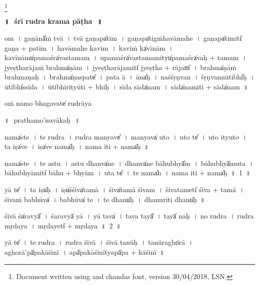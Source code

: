 \documentclass[parskip, DIV=14]{scrartcl}
\renewcommand{\thefootnote}{\fnsymbol{footnote}} %
\begin{document}
\LARGE\let\thefootnote\relax\footnote{\color{lightgray} Document written using \XeLaTeX{} and chandas font,  version 30/04/2018, LSN.}

\vspace{-1.5cm}

\begin{center}

\textbf{\Huge॥\,~śrī rudra krama pāṭha\,~॥}
\end{center}
\Large

{\centering	


\vspace{1cm}

om~। 
ga॒ṇānā̎ṁ tvā~।
tvā॒ ga॒ṇapa̍tim~।
ga॒ṇapa̍tigṁhavāmahe~।
ga॒ṇapa̍ti॒miti̍ ga॒ṇa + pa॒ti॒m~।
ha॒vā॒ma॒he॒ ka॒vim~।
ka॒viṁ ka̍vī॒nām~।
ka॒vī॒nāmu̍pa॒maśra̍vastamam~। 
u॒pa॒maśra̍vastama॒mityu̍pa॒maśra̍vaḥ + ta॒ma॒m~। 
jye॒ṣṭha॒rāja॒ṁ brahma̍ṇām~।
jye॒ṣṭha॒rāja॒miti̍ jyeṣṭha + rājam̎~।
brahma̍ṇāṁ brahmaṇaḥ~।
brahma̍ṇa॒spate̎~।
pa॒ta॒ ā~।
āna̍ḥ~।
na॒śśṛ॒ṇvan~।
śṛ॒ṇvannū॒tibhi̍ḥ~।
ū॒tibhi̍ssīda~।
ū॒tibhi॒rityū॒ti + bhi॒ḥ~। 
sī॒da॒ sāda̍nam~। 
sāda̍na॒miti॒ + sāda̍nam~॥ 

\vspace{5cm}

oṁ namo bhagavate̍ rudrā॒ya

\newpage
॥\,~prathamo'nuvākaḥ\,~॥\\

\vspace{1cm}

nama̍ste~। te॒ ru॒dra॒~। ru॒dra॒ ma॒nyave̎~। ma॒nyava̍ u॒to~। u॒to te̎~। u॒to ityu॒to~।
ta॒  iṣa̍ve~। iṣa̍ve॒ nama̍ḥ~। nama॒ iti॒ + nama̍ḥ~॥ 

nama̍ste~। te॒ a॒stu॒~। a॒stu॒ dhanva̍ne~। dhanva̍ne bā॒hubhyā̎m~। bā॒hubhyā̍mu॒ta~। 
bā॒hubhyā॒miti̍ bā॒hu + bhyā॒m~। u॒ta te̎~। te॒ nama̍h~। nama॒ iti॒ + nama̍ḥ~॥~1~॥
 
 yā te̎~। ta॒ iṣu̍ḥ~। iṣu̍śśi॒va̍tamā~। śi॒va̍tamā śi॒vam~। śi॒vata॒meti̍ śi॒va + ta॒mā॒~। śi॒vaṁ ba॒bhūva̍~। ba॒bhūva̍ te~।  te॒ dhanu̍ḥ~। dhanu॒riti॒ dhanu̍ḥ~॥ 
 
śi॒vā śa̍ra॒vyā̎~। śa॒ra॒vyā̍ yā~। yā tava̍~। tava॒ tayā̎~। 
tayā̍ naḥ~। no॒ ru॒dra॒~।  ru॒dra॒ mṛ॒da॒ya॒~। mṛ॒da॒yeti̍ + mṛdaya~॥~2~॥

yā te̎~। te॒ ru॒dra॒~। ru॒dra॒ śi॒vā~। śi॒vā ta॒nūḥ~। ta॒nūragho̍rā~। agho॒rā'pā̍pakāśinī~। 
apā̍pakāśi॒nītyapā̍pa + kā॒śi॒nī॒~॥

}
\end{document}
